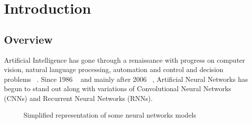 \section{Introduction}

\subsection{Overview}
Artificial Intelligence has gone through a renaissance with progress on computer vision, natural language processing, automation and control and decision problems ~\cite{Battaglia_2018}. Since 1986 ~\cite{Rumelhart_1986} and mainly after 2006 ~\cite{Hinton_2006}, Artificial Neural Networks has begun to stand out along with variations of Convolutional Neural Networks (CNNs) and Recurrent Neural Networks (RNNs).

\begin{figure}[!htb]
\centering

\caption{Simplified representation of some neural networks models ~\cite{Battaglia_2018}}

\label{fig:simple_neural_network}
\end{figure}


